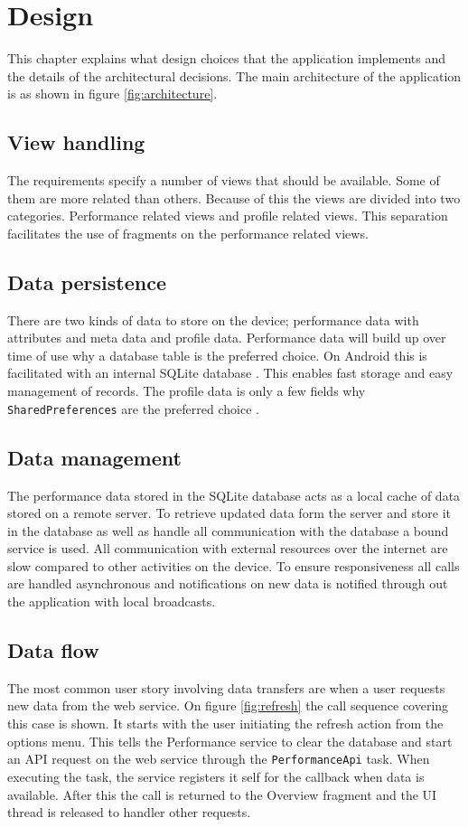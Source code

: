 \chapter{Design}
This chapter explains what design choices that the application implements and the details of the architectural decisions. The main architecture of the application is as shown in figure \ref{fig:architecture}. 

\section{View handling}
The requirements specify a number of views that should be available. Some of them are more related than others. Because of this the views are divided into two categories. Performance related views and profile related views. This separation facilitates the use of fragments on the performance related views.

\section{Data persistence}
There are two kinds of data to store on the device; performance data with attributes and meta data and profile data. Performance data will build up over time of use why a database table is the preferred choice. On Android this is facilitated with an internal SQLite database \citep{android:sqlite}. This enables fast storage and easy management of records. The profile data is only a few fields why \verb|SharedPreferences| are the preferred choice \citep{android:sharedprefs}.

\section{Data management}
The performance data stored in the SQLite database acts as a local cache of data stored on a remote server. To retrieve updated data form the server and store it in the database as well as handle all communication with the database a bound service is used. All communication with external resources over the internet are slow compared to other activities on the device. To ensure responsiveness all calls are handled asynchronous and notifications on new data is notified through out the application with local broadcasts.


\section{Data flow}
The most common user story involving data transfers are when a user requests new data from the web service. On figure \ref{fig:refresh} the call sequence covering this case is shown. It starts with the user initiating the refresh action from the options menu. This tells the Performance service to clear the database and start an API request on the web service through the \verb|PerformanceApi| task. When executing the task, the service registers it self for the callback when data is available. After this the call is returned to the Overview fragment and the UI thread is released to handler other requests.

